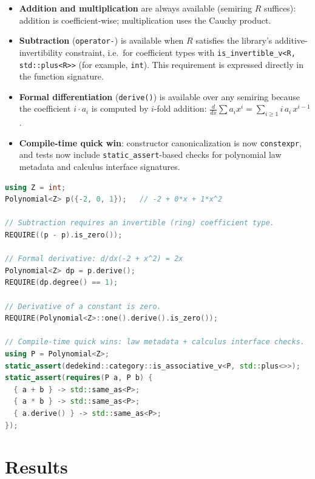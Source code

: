 \documentclass[11pt, a4paper]{report}
\begin{document}
\begin{itemize}
  \item \textbf{Addition and multiplication} are always available (semiring $R$ suffices):
        addition is coefficient-wise; multiplication uses the Cauchy product.
  \item \textbf{Subtraction} (\texttt{operator-}) is available when $R$ satisfies the
        library's additive-invertibility constraint, i.e.~for coefficient types with
        \texttt{is\_invertible\_v<R, std::plus<R>>} (for example, \texttt{int}).
        This requirement is expressed directly in the function signature.
  \item \textbf{Formal differentiation} (\texttt{derive()}) is available over any semiring
        because the coefficient $i \cdot a_i$ is computed by $i$-fold addition:
        $\frac{d}{dx}\textstyle\sum a_i x^i = \sum_{i \geq 1} i\,a_i\,x^{i-1}$.
    \item \textbf{Compile-time quick win}: constructor canonicalization is now
      \texttt{constexpr}, and tests now include \texttt{static\_assert}-based
      checks for polynomial law metadata and calculus interface signatures.
\end{itemize}

\begin{lstlisting}[language=C++, caption={Polynomial arithmetic and differentiation (from \texttt{polynomials\_test.cpp}).}, label={lst:polynomial}]
using Z = int;
Polynomial<Z> p({-2, 0, 1});   // -2 + 0*x + 1*x^2

// Subtraction requires an invertible (ring) coefficient type.
REQUIRE((p - p).is_zero());

// Formal derivative: d/dx(-2 + x^2) = 2x
Polynomial<Z> dp = p.derive();
REQUIRE(dp.degree() == 1);

// Derivative of a constant is zero.
REQUIRE(Polynomial<Z>::one().derive().is_zero());

// Compile-time quick wins: law metadata + calculus interface checks.
using P = Polynomial<Z>;
static_assert(dedekind::category::is_associative_v<P, std::plus<>>);
static_assert(requires(P a, P b) {
  { a + b } -> std::same_as<P>;
  { a * b } -> std::same_as<P>;
  { a.derive() } -> std::same_as<P>;
});
\end{lstlisting}

\section{Results}
\end{document}
